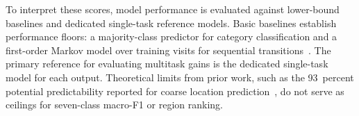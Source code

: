 To interpret these scores, model performance is evaluated against lower-bound
baselines and dedicated single-task reference models. Basic baselines establish
performance floors: a majority-class predictor for category classification and a
first-order Markov model over training visits for sequential
transitions~\cite{gambs2012mmc}. The primary reference for evaluating multitask gains
is the dedicated single-task model for each output.
Theoretical limits from prior work, such as the 93~percent potential predictability
reported for coarse location prediction~\cite{song2010limits}, do not serve as
ceilings for seven-class macro-F1 or region ranking.



